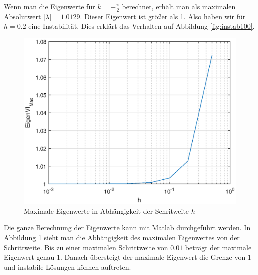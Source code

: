Wenn man die Eigenwerte für $k=-\frac{\pi}{2}$ berechnet, erhält man als maximalen Absolutwert $\vert \lambda \vert = 1.0129$.
Dieser Eigenwert ist größer als 1.
Also haben wir für $h=0.2$ eine Instabilität.
Dies erklärt das Verhalten auf Abbildung \ref{fig:instab100}. 
\begin{figure}
	\centering
	\includegraphics{verzoegert/inp/figures/eigenvl.eps}
	\caption{Maximale Eigenwerte in Abhängigkeit der Schritweite $h$}
	\label{fig:eigenvl}
\end{figure} 

Die ganze Berechnung der Eigenwerte kann mit Matlab durchgeführt werden. 
In Abbildung \ref{fig:eigenvl} sieht man die Abhängigkeit des maximalen Eigenwertes von der Schrittweite.
Bis zu einer maximalen Schrittweite von $0.01$ beträgt der maximale Eigenwert genau $1$.
Danach übersteigt der maximale Eigenwert die Grenze von $1$ und instabile Lösungen können auftreten.